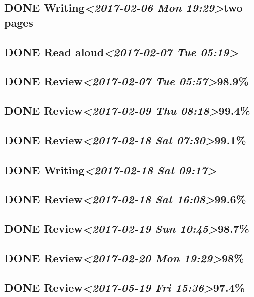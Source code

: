 \documentclass[11pt]{ctexart}
\begin{document}
\subsection{{\bfseries\sffamily DONE} Writing\textit{<2017-02-06 Mon 19:29>}two pages}
\label{sec:orgd15d634}
\subsection{{\bfseries\sffamily DONE} Read aloud\textit{<2017-02-07 Tue 05:19>}}
\label{sec:org98f8b9b}
\subsection{{\bfseries\sffamily DONE} Review\textit{<2017-02-07 Tue 05:57>}98.9\%}
\label{sec:org066a537}
\subsection{{\bfseries\sffamily DONE} Review\textit{<2017-02-09 Thu 08:18>}99.4\%}
\label{sec:orgdfd77eb}
\subsection{{\bfseries\sffamily DONE} Review\textit{<2017-02-18 Sat 07:30>}99.1\%}
\label{sec:org09cbeef}
\subsection{{\bfseries\sffamily DONE} Writing\textit{<2017-02-18 Sat 09:17>}}
\label{sec:org561e8eb}
\subsection{{\bfseries\sffamily DONE} Review\textit{<2017-02-18 Sat 16:08>}99.6\%}
\label{sec:orgbffd3a6}
\subsection{{\bfseries\sffamily DONE} Review\textit{<2017-02-19 Sun 10:45>}98.7\%}
\label{sec:org124ed9f}
\subsection{{\bfseries\sffamily DONE} Review\textit{<2017-02-20 Mon 19:29>}98\%}
\label{sec:orgd6bfe57}
\subsection{{\bfseries\sffamily DONE} Review\textit{<2017-05-19 Fri 15:36>}97.4\%}
\label{sec:org081ef71}
\end{document}
